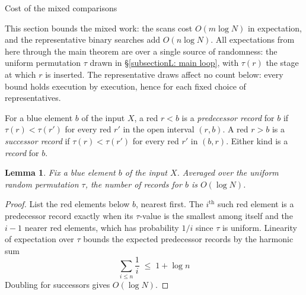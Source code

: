 \documentclass[11pt]{article}
\newtheorem{lem}[thm]{Lemma}
\theoremstyle{definition}
\numberwithin{equation}{section}
\begin{document}
\begin{section}{Cost of the mixed comparisons}
\begin{aiblock}
This section bounds the mixed work: the scans cost $O(m \log N)$ in
expectation, and the representative binary searches add
$O(n \log N)$. All expectations from here through the main theorem
are over a single source of randomness: the uniform permutation
$\tau$ drawn in \S\ref{subsectionL: main loop}, with $\tau(r)$ the
stage at which $r$ is inserted. The representative draws affect no
count below: every bound holds execution by execution, hence for
each fixed choice of representatives.

For a blue element $b$ of the input $X$, a red $r < b$ is a
{\em predecessor record} for $b$ if $\tau(r) < \tau(r')$ for every
red $r'$ in the open interval $(r,b)$. A red $r > b$ is a
{\em successor record} if $\tau(r) < \tau(r')$ for every red $r'$
in $(b,r)$. Either kind is a {\em record} for $b$.

\begin{lem}\label{lem:records}
Fix a blue element $b$ of the input $X$. Averaged over the uniform
random permutation $\tau$, the number of records for $b$ is
$O(\log N)$.
\end{lem}
\begin{proof}
List the red elements below $b$, nearest first. The $i^\text{th}$ such red element is a predecessor
record exactly when its $\tau$-value is the smallest among itself
and the $i-1$ nearer red elements, which has probability $1/i$ since $\tau$
is uniform. Linearity of expectation over $\tau$ bounds the
expected predecessor records by the harmonic sum
$$
\sum_{i\le n}\frac{1}{i}\;\le\;1 + \log n
$$
Doubling for successors gives
$O(\log N)$.
\end{proof}


\end{aiblock}
\end{section}
\end{document}
